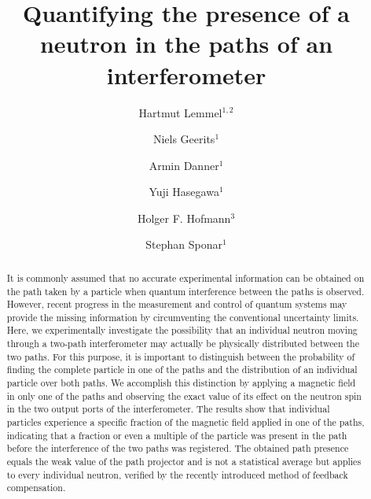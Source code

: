 \documentclass[english,keywords,aps,twocolumn]{revtex4-1}
\begin{document}
\title{Quantifying the presence of a neutron in the paths of an interferometer}

\author{Hartmut Lemmel$^{1,2}$}
\author{Niels Geerits$^{1}$}
\author{Armin Danner$^{1}$}
\author{Yuji Hasegawa$^{1}$}
\author{Holger F. Hofmann$^{3}$}
\author{Stephan Sponar$^{1}$}


\begin{abstract}
It is commonly assumed that no accurate experimental information can be obtained on the path taken by a particle when quantum interference between the paths is observed. However, recent progress in the measurement and control of quantum systems may provide the missing information by circumventing the conventional uncertainty limits. Here, we experimentally investigate the possibility that an individual neutron moving through a two-path interferometer may actually be physically distributed between the two paths. For this purpose, it is important to distinguish between the probability of finding the complete particle in one of the paths and the distribution of an individual particle over both paths.
We accomplish this distinction by applying a magnetic field in only one of the paths and observing the exact value of its effect on the neutron spin in the two output ports of the interferometer. The results show that individual particles experience a specific fraction of the magnetic field applied in one of the paths, indicating that a fraction or even a multiple of the particle was present in the path before the interference of the two paths was registered.
The obtained path presence equals the weak value of the path projector and is not a statistical average but applies to every individual neutron, verified by the recently introduced method of feedback compensation.

\end{abstract}
\end{document}
